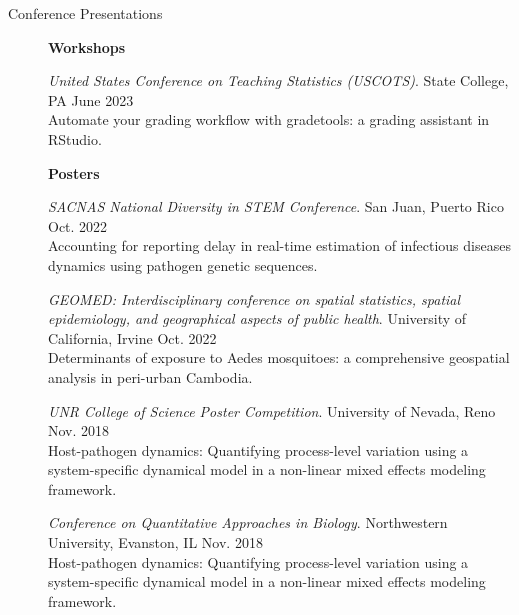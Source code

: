 \documentclass{article}
\begin{document}
\begin{description}
	\vspace{-2mm}
	\item[Conference Presentations]\hspace*{.1in}
	 
	\textbf{Workshops}
	
	\setlength{\leftskip}{0.5cm}
	
		\vspace*{1mm}	
		
		\textit{United States Conference on Teaching Statistics (USCOTS)}. State College, PA \hfill{June 2023}\\ 
		Automate your grading workflow with gradetools: a grading assistant in RStudio.
		
		\setlength{\leftskip}{0cm}

	\textbf{Posters}
	
	\setlength{\leftskip}{0.5cm}
	
		\vspace*{1mm}	

		\textit{SACNAS National Diversity in STEM Conference}. San Juan, Puerto Rico \hfill{Oct. 2022}\\
		Accounting for reporting delay in real-time estimation of infectious diseases dynamics using pathogen genetic sequences.
		\vspace*{1mm}
		
		\textit{GEOMED: Interdisciplinary conference on spatial statistics, spatial epidemiology, and geographical aspects of public health}. University of California, Irvine \hfill{Oct. 2022}\\
		Determinants of exposure to Aedes mosquitoes: a comprehensive geospatial analysis in peri-urban Cambodia.
		\vspace*{1mm}
		
		\textit{UNR College of Science Poster Competition}. University of Nevada, Reno \hfill{Nov. 2018}\\
		Host-pathogen dynamics: Quantifying process-level variation using a system-specific dynamical model in a non-linear mixed effects modeling framework.
		\vspace*{1mm}
		
		\textit{Conference on Quantitative Approaches in Biology}. Northwestern University, Evanston, IL \hfill{Nov. 2018}\\
		Host-pathogen dynamics: Quantifying process-level variation using a system-specific dynamical model in a non-linear mixed effects modeling framework. 
		\vspace*{1mm}
		

\end{description}
\end{document}
